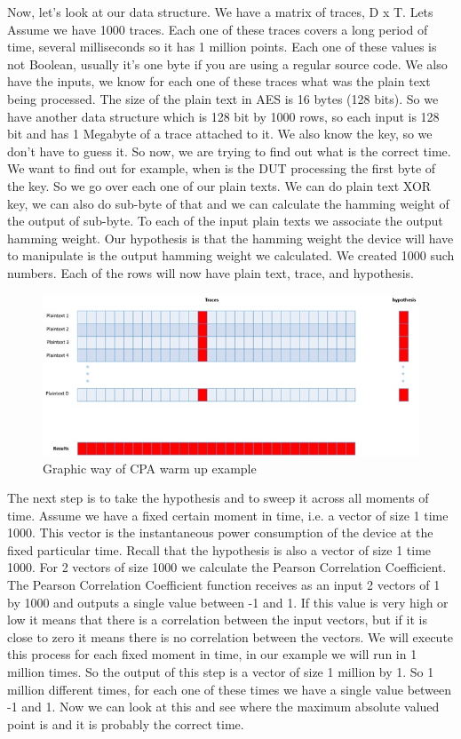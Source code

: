 Now, let's look at our data structure. We have a matrix of traces, D x T.
Lets Assume we have 1000 traces. Each one of these traces covers a long period of
time, several milliseconds so it has 1 million points. Each one of these values
is not Boolean, usually it's one byte if you are using a regular source code. We
also have the inputs, we know for each one of these traces what was the plain
text being processed. The size of the plain text in AES is 16 bytes (128 bits).
So we have another data structure which is 128 bit by 1000 rows, so each input
is 128 bit and has 1 Megabyte of a trace attached to it. We also know the key, so we
don't have to guess it. So now, we are trying to find out what is the correct
time. We want to find out for example, when is the DUT processing the first byte
of the key. So we go over each one of our plain texts. We can do plain text XOR
key, we can also do sub-byte of that and we can calculate the hamming weight of the output
of sub-byte. To each of the input plain texts we associate the output hamming
weight. Our hypothesis is that the hamming weight the device will have to
manipulate is the output hamming weight we calculated. We created 1000 such
numbers. Each of the rows will now have plain text, trace, and hypothesis.

\begin{figure}[!ht]
    \centering
    \includegraphics[width=1.0\textwidth]{images/chapter8/cpa_warmup_example.jpg}
    \caption{Graphic way of CPA warm up example} \label{c8_cpa_warmup_example:fig}
\end{figure}

The next step is to take the hypothesis and to sweep it across all moments of
time. Assume we have a fixed certain moment in time, i.e. a vector of size 1
time 1000. This vector is the instantaneous power consumption of the device at
the fixed particular time. Recall that the hypothesis is also a vector of size 1
time 1000. For 2 vectors of size 1000 we calculate the Pearson Correlation
Coefficient. The Pearson Correlation Coefficient function receives as an input 2
vectors of 1 by 1000 and outputs a single value between -1 and 1. If this value
is very high or low it means that there is a correlation between the input
vectors, but if it is close to zero it means there is no correlation between the
vectors. We will execute this process for each fixed moment in time, in our
example we will run in 1 million times. So the output of this step is a vector
of size 1 million by 1. So 1 million different times, for each one of these
times we have a single value between -1 and 1. Now we can look at this and see
where the maximum absolute valued point is and it is probably the correct time.

